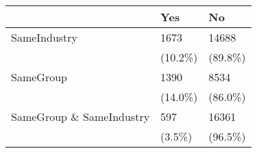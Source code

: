 \begin{tabular}{lll}
\toprule
{} &      Yes &       No \\
\midrule
SameIndustry             &     1673 &    14688 \\
                         &  (10.2\%) &  (89.8\%) \\
SameGroup                &     1390 &     8534 \\
                         &  (14.0\%) &  (86.0\%) \\
SameGroup \& SameIndustry &      597 &    16361 \\
                         &   (3.5\%) &  (96.5\%) \\
\bottomrule
\end{tabular}
